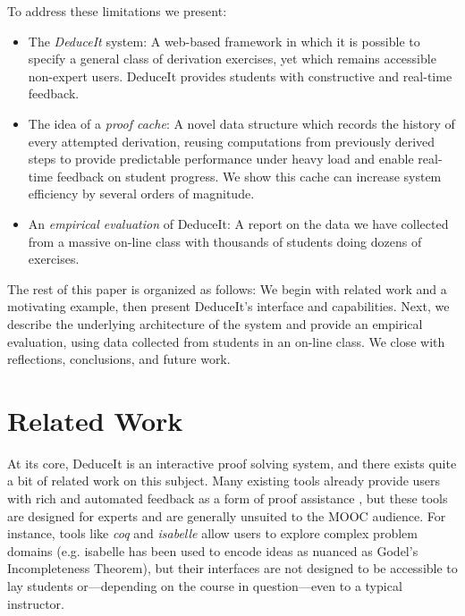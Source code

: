 \documentclass{sigchi}
\begin{document}
To address these limitations we present:
\begin{itemize}
\item The \textit{DeduceIt} system: A web-based framework in which it is possible to specify a general class of derivation exercises, yet which remains accessible non-expert users. DeduceIt provides students with constructive and real-time feedback.
\item The idea of a \textit{proof cache}: A novel data structure which records the history of every attempted derivation, reusing computations from previously derived steps to provide predictable performance under heavy load and enable real-time feedback on student progress. We show this cache can increase system efficiency by several orders of magnitude.
\item An \textit{empirical evaluation} of DeduceIt: A report on the data we have collected from a massive on-line class with thousands of students doing dozens of exercises.
\end{itemize}

The rest of this paper is organized as follows: We begin with related work and a motivating example, then present DeduceIt's interface and capabilities. Next, we describe the underlying architecture of the system and provide an empirical evaluation, using data collected from students in an on-line class. We close with reflections, conclusions, and future work.

\section{Related Work}
At its core, DeduceIt is an interactive proof solving system, and there exists quite a bit of related work on this subject. Many existing tools already provide users with rich and automated feedback as a form of proof assistance \cite{coq,maude,isabelle, isabelle1,lisp-logic}, but these tools are designed for experts and are generally unsuited to the MOOC audience. For instance, tools like \textit{coq} and \textit{isabelle} allow users to explore complex problem domains (e.g. isabelle has been used to encode ideas as nuanced as Godel's Incompleteness Theorem), but their interfaces are not designed to be accessible to lay students or---depending on the course in question---even to a typical instructor. 
\end{document}
